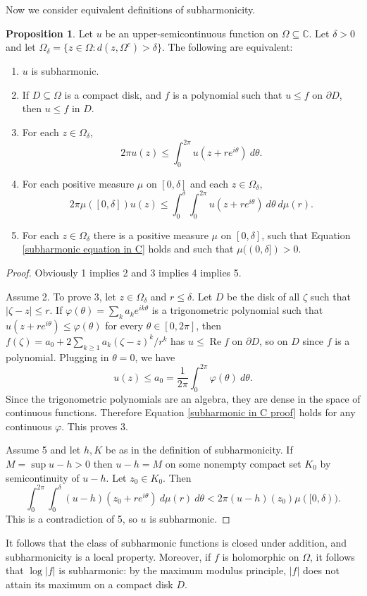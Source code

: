 \documentclass[12pt]{report}
\newcommand{\CC}{\mathbb{C}}
\renewcommand{\Re}{\operatorname{Re}}
\theoremstyle{definition}
\newtheorem{proposition}[theorem]{Proposition}
\begin{document}
Now we consider equivalent definitions of subharmonicity.
\begin{proposition}
Let $u$ be an upper-semicontinuous function on $\Omega \subseteq \CC$. Let $\delta > 0$ and let $\Omega_\delta = \{z \in \Omega: d(z, \Omega^c) > \delta\}$. The following are equivalent:
\begin{enumerate}
    \item $u$ is subharmonic.
    \item If $D \subseteq \Omega$ is a compact disk, and $f$ is a polynomial such that $u \leq f$ on $\partial D$, then $u \leq f$ in $D$.
    \item For each $z \in \Omega_\delta$,
    $$2\pi u(z) \leq \int_0^{2\pi} u(z+re^{i\theta}) ~d\theta.$$
    \item For each positive measure $\mu$ on $[0, \delta]$ and each $z \in \Omega_\delta$,
    \begin{equation}
        \label{subharmonic equation in C}
        2\pi \mu([0, \delta]) u(z) \leq \int_0^\delta \int_0^{2\pi} u(z + re^{i\theta}) ~d\theta ~d\mu(r).
    \end{equation}
    \item For each $z \in \Omega_\delta$ there is a positive measure $\mu$ on $[0, \delta]$, such that Equation \ref{subharmonic equation in C} holds and such that $\mu((0, \delta]) > 0$.
\end{enumerate}
\end{proposition}
\begin{proof}
    Obviously 1 implies 2 and 3 implies 4 implies 5.

    Assume 2. To prove 3, let $z \in \Omega_\delta$ and $r \leq \delta$. Let $D$ be the disk of all $\zeta$ such that $|\zeta - z| \leq r$. If $\varphi(\theta) = \sum_k a_k e^{ik\theta}$ is a trigonometric polynomial such that $u(z + re^{i\theta}) \leq \varphi(\theta)$ for every $\theta \in [0, 2\pi]$, then $f(\zeta) = a_0 + 2\sum_{k\geq 1} a_k(\zeta - z)^k/r^k$ has $u \leq \Re f$ on $\partial D$, so on $D$ since $f$ is a polynomial. Plugging in $\theta = 0$, we have
\begin{equation}
    \label{subharmonic in C proof}
    u(z) \leq a_0 = \frac{1}{2\pi} \int_0^{2\pi} \varphi(\theta) ~d\theta.
\end{equation}
    Since the trigonometric polynomials are an algebra, they are dense in the space of continuous functions. Therefore Equation \ref{subharmonic in C proof} holds for any continuous $\varphi$. This proves 3.

    Assume 5 and let $h, K$ be as in the definition of subharmonicity. If $M = \sup u - h > 0$ then $u - h = M$ on some nonempty compact set $K_0$ by semicontinuity of $u - h$. Let $z_0 \in K_0$. Then
    $$\int_0^{2\pi} \int_0^\delta (u-h)(z_0 + re^{i\theta}) ~d\mu(r) ~d\theta < 2\pi (u-h)(z_0) \mu([0, \delta)).$$
    This is a contradiction of 5, so $u$ is subharmonic.
\end{proof}
    It follows that the class of subharmonic functions is closed under addition, and subharmonicity is a local property. Moreover, if $f$ is holomorphic on $\Omega$, it follows that $\log|f|$ is subharmonic: by the maximum modulus principle, $|f|$ does not attain its maximum on a compact disk $D$.
\end{document}

